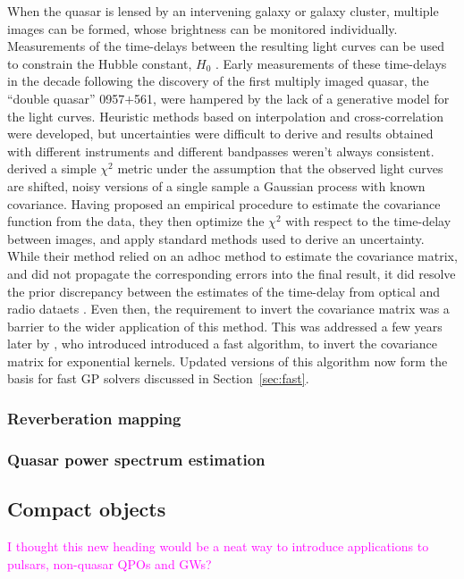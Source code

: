 \documentclass[letterpaper]{ar-1col}
\newcommand{\suz}[1]{\textcolor{magenta}{#1}}
\begin{document}
When the quasar is lensed by an intervening galaxy or galaxy cluster, multiple images can be formed, whose brightness can be monitored individually. Measurements of the time-delays between the resulting light curves can be used to constrain the Hubble constant, $H_0$ \citep{doi:10.1146/annurev.aa.30.090192.001523}. Early measurements of these time-delays in the decade following the discovery of the first multiply imaged quasar, the ``double quasar'' 0957$+$561, were hampered by the lack of a generative model for the light curves. Heuristic methods based on interpolation and cross-correlation were developed, but uncertainties were difficult to derive and results obtained with different instruments and different bandpasses weren't always consistent. \citet{prh92a} derived a simple $\chi^2$ metric under the assumption that the observed light curves are shifted, noisy versions of a single sample a Gaussian process with known covariance. Having proposed an empirical procedure to estimate the covariance function from the data, they then optimize the $\chi^2$ with respect to the time-delay between images, and apply standard methods used to derive an uncertainty. While their method relied on an adhoc method to estimate the covariance matrix, and did not propagate the corresponding errors into the final result, it did resolve the prior discrepancy between the estimates of the time-delay from optical and radio dataets \citet{prh92b}. Even then, the requirement to invert the covariance matrix was a barrier to the wider application of this method. This was addressed a few years later by \citet{pr95}, who introduced introduced a fast algorithm, to invert the covariance matrix for exponential kernels. Updated versions of this algorithm now form the basis for fast GP solvers discussed in Section~\ref{sec:fast}.

\subsubsection{Reverberation mapping}

\subsubsection{Quasar power spectrum estimation}

\subsection{Compact objects}
\suz{I thought this new heading would be a neat way to introduce applications to pulsars, non-quasar QPOs and GWs?}
\end{document}
